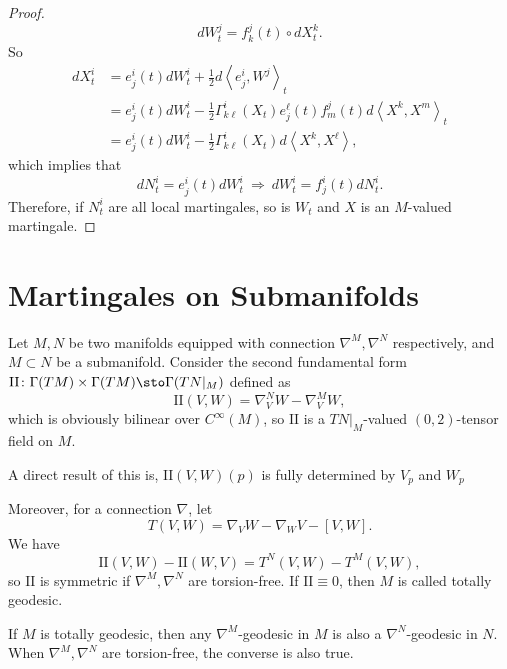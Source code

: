 \begin{proof}
\begin{equation*}
        d W_t^j=f_k^j(t) \circ d X_t^k.
    \end{equation*}
    So
    \begin{align*}
        d X_t^i & =e_j^i(t) d W_t^i+\frac{1}{2} d\left\langle e_j^i, W^j\right\rangle_t \\
        & =e_j^i(t) d W_t^i-\frac{1}{2} \Gamma_{k \ell}^i\left(X_t\right) e_j^\ell(t) f_m^j(t) d\left\langle X^k, X^m\right\rangle_t \\
        & =e_j^i(t) d W_t^i-\frac{1}{2} \Gamma_{k \ell}^i\left(X_t\right) d\left\langle X^k, X^\ell\right\rangle,
    \end{align*}
    which implies that
    \begin{equation*}
        dN^i_t = e_j^i(t) d W_t^i ~\Rightarrow~d W_t^i=f_j^i(t) d N_t^i.
    \end{equation*}
    Therefore, if $N_t^i$ are all local martingales, so is $W_t$ and $X$ is an $M$-valued martingale.
\end{proof}

\section{Martingales on Submanifolds}

Let $M,N$ be two manifolds equipped with connection $\nabla^M,\nabla^N$ respectively, and $M \subset N$ be a submanifold. Consider the second fundamental form $\mathrm{II} \colon \Gamma(TM) \times \Gamma(TM) \sto \Gamma(TN|_M)$ defined as
\begin{equation*}
    \mathrm{II}(V,W) = \nabla^N_VW - \nabla^M_VW,
\end{equation*}
which is obviously bilinear over $C^\infty(M)$, so $\mathrm{II}$ is a $TN|_M$-valued $(0,2)$-tensor field on $M$. 
\begin{rmk}
    A direct result of this is, $\mathrm{II}(V,W)(p)$ is fully determined by $V_p$ and $W_p$
\end{rmk}
Moreover, for a connection $\nabla$, let
\begin{equation*}
    T(V,W) = \nabla_VW - \nabla_WV - [V,W].
\end{equation*}
We have
\begin{equation*}
    \mathrm{II}(V,W) - \mathrm{II}(W,V) = T^N(V,W) - T^M(V,W),
\end{equation*}
so $\mathrm{II}$ is symmetric if $\nabla^M,\nabla^N$ are torsion-free. If $\mathrm{II} \equiv 0$, then $M$ is called totally geodesic.

\begin{prop}
    If $M$ is totally geodesic, then any $\nabla^M$-geodesic in $M$ is also a $\nabla^N$-geodesic in $N$. When $\nabla^M,\nabla^N$ are torsion-free, the converse is also true.
\end{prop}

